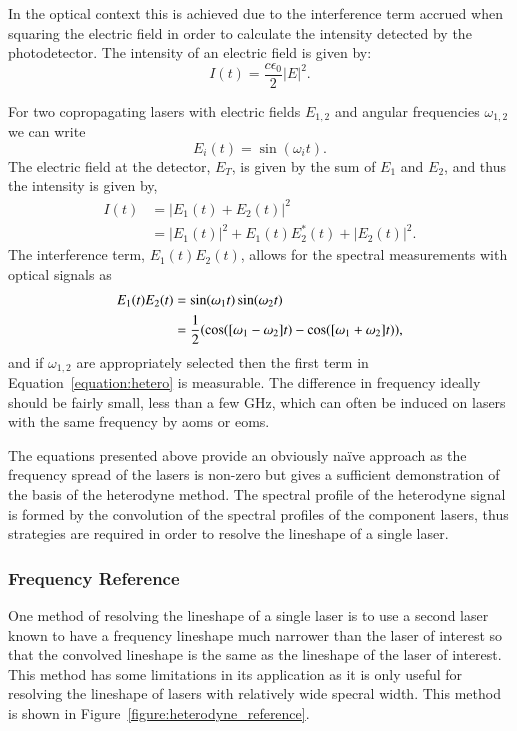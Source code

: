 In the optical context this is achieved due to the interference term accrued when squaring the electric field in order to calculate the intensity detected by the photodetector. The intensity of an electric field is given by:
\begin{equation}
I(t) = \frac{c\epsilon_0}{2}|E|^2.
\end{equation}

For two copropagating lasers with electric fields $E_{1, 2}$ and angular frequencies $\omega_{1, 2}$ we can write
\begin{equation}
E_{i}(t) = \sin(\omega_{i}t).
\end{equation}
The electric field at the detector, $E_T$, is given by the sum of $E_{1}$ and $E_{2}$, and thus the intensity is given by,
\begin{align}
I(t) &= |E_1(t) + E_2(t)|^2\nonumber\\
&= |E_1(t)|^2 + E_1(t)E_2^*(t) + |E_2(t)|^2.
\end{align}
The interference term, $E_1(t)E_2(t)$, allows for the spectral measurements with optical signals as
\begin{align}
E_1(t)E_2(t) &= \sin(\omega_1 t) \sin(\omega_2 t) \notag \\
&= \frac{1}{2} (\cos([\omega_1-\omega_2]t) - \cos([\omega_1+\omega_2]t)), \label{equation:hetero}
\end{align}
and if $\omega_{1,2}$ are appropriately selected then the first term in Equation~\ref{equation:hetero} is measurable.
The difference in frequency ideally should be fairly small, less than a few GHz, which can often be induced on lasers with the same frequency by \glspl{aom} or \glspl{eom}.

The equations presented above provide an obviously na\"ive approach as the frequency spread of the lasers is non-zero but gives a sufficient demonstration of the basis of the heterodyne method.
The spectral profile of the heterodyne signal is formed by the convolution of the spectral profiles of the component lasers, thus strategies are required in order to resolve the lineshape of a single laser.

\subsubsection{Frequency Reference}
One method of resolving the lineshape of a single laser is to use a second laser known to have a frequency lineshape much narrower than the laser of interest so that the convolved lineshape is the same as the lineshape of the laser of interest.
This method has some limitations in its application as it is only useful for resolving the lineshape of lasers with relatively wide specral width.
This method is shown in Figure~\ref{figure:heterodyne_reference}.

